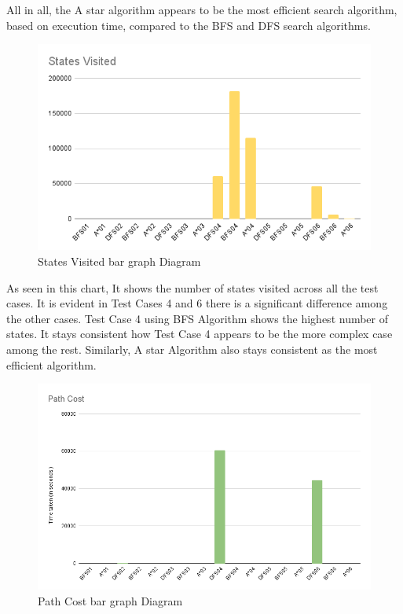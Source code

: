 \documentclass[journal]{./IEEE/IEEEtran}
\begin{document}
All in all, the A star algorithm appears to be the most efficient search algorithm, based on execution 
time, compared to the BFS and DFS search algorithms.

\begin{figure}[H]
    \centering
    \includegraphics[width=1\linewidth]{pictures-Elisha/States Visited (1).png}
    \caption{States Visited bar graph Diagram}
    \label{fig:states_visited_bar_graph}
\end{figure}

As seen in this chart, It shows the number of states visited across all the test cases. 
It is evident in Test Cases 4 and 6 there is a significant difference among the other cases. 
Test Case 4 using BFS Algorithm shows the highest number of states. It stays consistent how Test Case 
4 appears to be the more complex case among the rest. Similarly, A star Algorithm also stays 
consistent as the most efficient algorithm.

\begin{figure}[H]
    \centering
    \includegraphics[width=1\linewidth]{pictures-Elisha/Path Cost (1).png}
    \caption{Path Cost bar graph Diagram}
    \label{fig:path_cost_bar_graph}
\end{figure}
\end{document}

